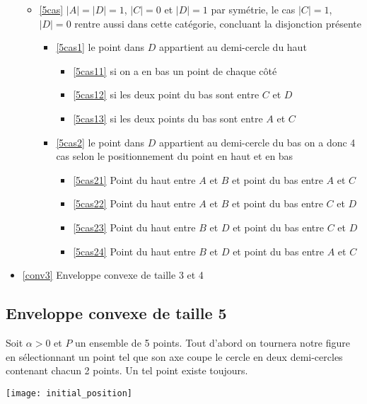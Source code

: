 \begin{itemize}
\begin{itemize}
\begin{itemize}
		\end{itemize}
		\item \ref{5cas} $|A| = |D| = 1$, $|C| = 0$ et $|D| = 1$
		par symétrie, le cas $|C| = 1$, $|D| = 0$ rentre aussi dans cette catégorie, concluant la disjonction présente
		\begin{itemize}
			\item \ref{5cas1} le point dans $D$ appartient au demi-cercle du haut
			\begin{itemize}
				\item \ref{5cas11} si on a en bas un point de chaque côté
				\item \ref{5cas12} si les deux point du bas sont entre $C$ et $D$
				\item \ref{5cas13} si les deux points du bas sont entre $A$ et $C$
			\end{itemize}
			\item \ref{5cas2} le point dans $D$ appartient au demi-cercle du bas
			on a donc 4 cas selon le positionnement du point en haut et en bas
			\begin{itemize}
				\item \ref{5cas21} Point du haut entre $A$ et $B$ et point du bas entre $A$ et $C$
				\item \ref{5cas22} Point du haut entre $A$ et $B$ et point du bas entre $C$ et $D$
				\item \ref{5cas23} Point du haut entre $B$ et $D$ et point du bas entre $C$ et $D$
				\item \ref{5cas24} Point du haut entre $B$ et $D$ et point du bas entre $A$ et $C$
			\end{itemize}
		\end{itemize}
	\end{itemize}
	\item \ref{conv3} Enveloppe convexe de taille 3 et 4
\end{itemize}

\subsection{Enveloppe convexe de taille 5}\label{conv5}

Soit $\alpha > 0$ et $P$ un ensemble de 5 points. Tout d'abord on tournera notre
figure en sélectionnant un point tel que son axe coupe le cercle en deux
demi-cercles contenant chacun 2 points. Un tel point existe toujours.

  \texttt{[image: initial\_position]}

